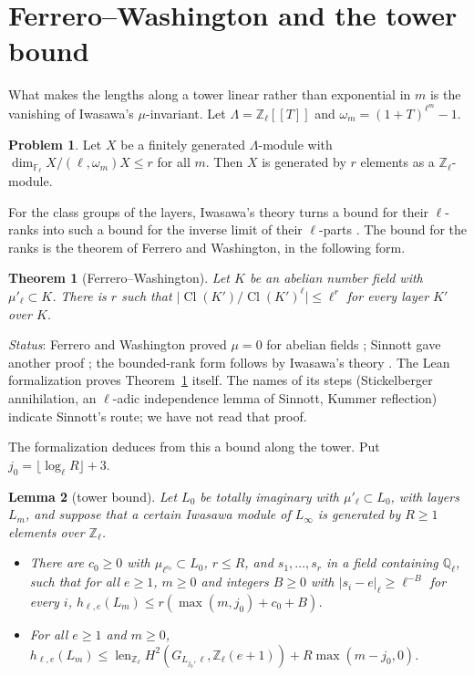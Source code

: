 \documentclass[reqno]{amsart}
\theoremstyle{definition}
\newtheorem{problem}{Problem}[section]
\theoremstyle{plain}
\newtheorem{theorem}{Theorem}[section]
\newtheorem{lemma}[theorem]{Lemma}
\theoremstyle{remark}
\newcommand{\Z}{\mathbb{Z}}
\newcommand{\Q}{\mathbb{Q}}
\newcommand{\F}{\mathbb{F}}
\newcommand{\Zl}{\Z_\ell}
\newcommand{\Ql}{\Q_\ell}
\newcommand{\Cl}{\operatorname{Cl}}
\newcommand{\len}{\operatorname{len}}
\begin{document}
\section{Ferrero--Washington and the tower bound}\label{sec:fw}

What makes the lengths along a tower linear rather than exponential in \(m\) is the vanishing of Iwasawa's \(\mu\)-invariant.  Let \(\Lambda=\Zl[[T]]\) and \(\omega_m=(1+T)^{\ell^m}-1\).

\begin{problem}\label{pr:nakayama}
Let \(X\) be a finitely generated \(\Lambda\)-module with \(\dim_{\F_\ell}X/(\ell,\omega_m)X\le r\) for all \(m\).  Then \(X\) is generated by \(r\) elements as a \(\Zl\)-module.
\end{problem}

For the class groups of the layers, Iwasawa's theory turns a bound for their \(\ell\)-ranks into such a bound for the inverse limit of their \(\ell\)-parts \cite[Ch.~13]{Wa}.  The bound for the ranks is the theorem of Ferrero and Washington, in the following form.

\begin{theorem}[Ferrero--Washington]\label{thm:fw}
Let \(K\) be an abelian number field with \(\mu'_\ell\subset K\).  There is \(r\) such that \(\lvert\Cl(K')/\Cl(K')^\ell\rvert\le\ell^r\) for every layer \(K'\) over \(K\).
\end{theorem}

\noindent\emph{Status}: Ferrero and Washington proved \(\mu=0\) for abelian fields \cite{FW}; Sinnott gave another proof \cite{Si}; the bounded-rank form follows by Iwasawa's theory \cite[Ch.~13]{Wa}.  The Lean formalization \cite{Lean} proves Theorem~\ref{thm:fw} itself.  The names of its steps (Stickelberger annihilation, an \(\ell\)-adic independence lemma of Sinnott, Kummer reflection) indicate Sinnott's route; we have not read that proof.

The formalization deduces from this a bound along the tower.  Put \(j_0=\lfloor\log_\ell R\rfloor+3\).

\begin{lemma}[tower bound]\label{lem:tower}
Let \(L_0\) be totally imaginary with \(\mu'_\ell\subset L_0\), with layers \(L_m\), and suppose that a certain Iwasawa module of \(L_\infty\) is generated by \(R\ge1\) elements over \(\Zl\).
\begin{itemize}
\item[(a)] There are \(c_0\ge0\) with \(\mu_{\ell^{c_0}}\subset L_0\), \(r\le R\), and \(s_1,\dots,s_r\) in a field containing \(\Ql\), such that for all \(e\ge1\), \(m\ge0\) and integers \(B\ge0\) with \(\lvert s_i-e\rvert_\ell\ge\ell^{-B}\) for every \(i\), \(h_{\ell,e}(L_m)\le r(\max(m,j_0)+c_0+B)\).
\item[(b)] For all \(e\ge1\) and \(m\ge0\), \(h_{\ell,e}(L_m)\le\len_{\Zl}H^2(G_{L_{j_0},\ell},\Zl(e+1))+R\max(m-j_0,0)\).
\end{itemize}
\end{lemma}
\end{document}
